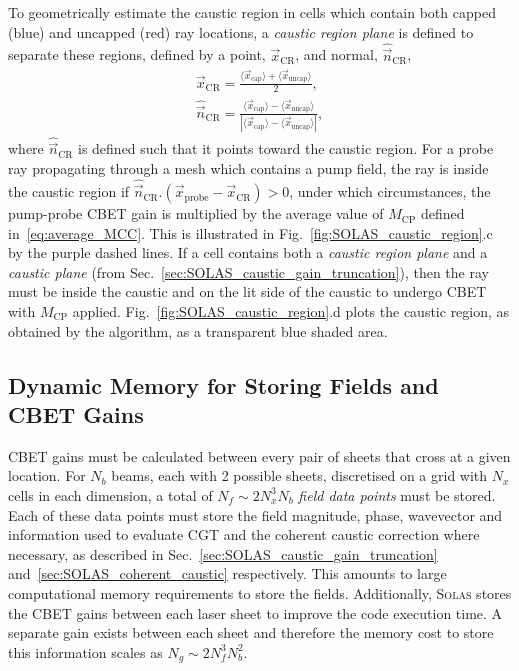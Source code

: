 To geometrically estimate the caustic region in cells which contain both capped (blue) and uncapped (red) ray locations, a \textit{caustic region plane} is defined to separate these regions, defined by a point, $\vec{x}_{\text{CR}}$, and normal, $\hat{\vec{n}}_{\text{CR}}$,
\begin{equation}
    \label{eq:SOLAS_caustic_region_plane}
    \begin{gathered}
        \vec{x}_{\text{CR}} = \frac{\langle\vec{x}_{\text{cap}}\rangle + \langle\vec{x}_{\text{uncap}}\rangle}{2}, \\
        \hat{\vec{n}}_{\text{CR}} = \frac{\langle\vec{x}_{\text{cap}}\rangle - \langle\vec{x}_{\text{uncap}}\rangle}{ | \langle\vec{x}_{\text{cap}}\rangle - \langle\vec{x}_{\text{uncap}}\rangle | },
    \end{gathered}
\end{equation}
where $\hat{\vec{n}}_{\text{CR}}$ is defined such that it points toward the caustic region.
For a probe ray propagating through a mesh which contains a pump field, the ray is inside the caustic region if $\hat{\vec{n}}_{\text{CR}}.(\vec{x}_{\text{probe}} - \vec{x}_{\text{CR}})>0$, under which circumstances, the pump-probe \ac{CBET} gain is multiplied by the average value of $M_{\text{CP}}$ defined in~\ref{eq:average_MCC}.
This is illustrated in Fig.~\ref{fig:SOLAS_caustic_region}.c by the purple dashed lines.
If a cell contains both a \textit{caustic region plane} and a \textit{caustic plane} (from Sec.~\ref{sec:SOLAS_caustic_gain_truncation}), then the ray must be inside the caustic and on the lit side of the caustic to undergo \ac{CBET} with $M_{\text{CP}}$ applied.
Fig.~\ref{fig:SOLAS_caustic_region}.d plots the caustic region, as obtained by the algorithm, as a transparent blue shaded area.

\subsection{Dynamic Memory for Storing Fields and CBET Gains}%
\label{sec:SOLAS_memory}

\ac{CBET} gains must be calculated between every pair of sheets that cross at a given location.
For $N_b$ beams, each with 2 possible sheets, discretised on a grid with $N_x$ cells in each dimension, a total of $N_f\sim 2 N_x^3 N_b$ \textit{field data points} must be stored.
Each of these data points must store the field magnitude, phase, wavevector and information used to evaluate \ac{CGT} and the coherent caustic correction where necessary, as described in Sec.~\ref{sec:SOLAS_caustic_gain_truncation} and~\ref{sec:SOLAS_coherent_caustic} respectively.
This amounts to large computational memory requirements to store the fields.
Additionally, \textsc{Solas} stores the \ac{CBET} gains between each laser sheet to improve the code execution time.
A separate gain exists between each sheet and therefore the memory cost to store this information scales as $N_g\sim 2 N_f^3 N_b^2$.

